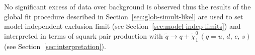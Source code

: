 No significant excess of data over background is observed thus the results of
the global fit procedure described in Section~\ref{sec:glob-simult-likel} are
used to set model independent exclusion limit (see
Section~\ref{sec:model-indep-limits}) and interpreted in terms of squark pair
production with $\widetilde{q} \rightarrow q + \widetilde{\chi}_1^0\, (q = u,\,
d,\, c,\, s)$ (see Section~\ref{sec:interpretation}).
